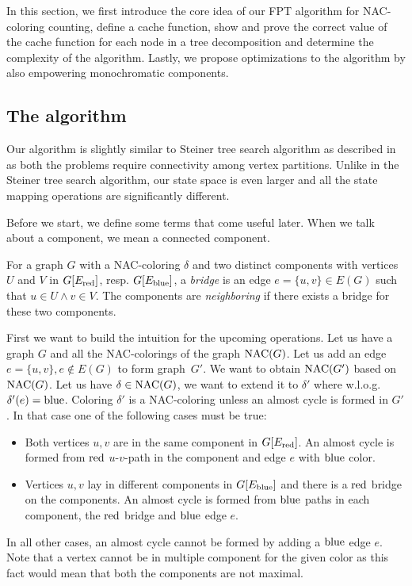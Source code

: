 In this section, we first introduce the core idea of
our FPT algorithm for NAC-coloring counting,
define a cache function,
show and prove the correct value of the cache function for each node in a tree decomposition
and determine the complexity of the algorithm.
Lastly, we propose optimizations to the algorithm by also empowering monochromatic components.

\subsection{The algorithm}

Our algorithm is slightly similar to Steiner tree search algorithm
as described in~\cite{book_parametrized_algorithms} as both the problems require connectivity
among vertex partitions. Unlike in the Steiner tree search algorithm,
our state space is even larger and all the state mapping operations are significantly different.

Before we start, we define some terms that come useful later.
When we talk about a component, we mean a connected component.
%
\begin{definition}
	For a graph \( G \) with a NAC-coloring \( \delta \)
	and two distinct components
	with vertices \( U \) and \( V \)
	in \( G[E_\text{red}] \), resp. \( G[E_\text{blue}] \),
	a \emph{bridge} is an edge \( e = \{u, v\} \in E(G) \)
	such that \( u \in U \land v \in V \).
	The components are \emph{neighboring} if there exists
	a bridge for these two components.
\end{definition}
%

First we want to build the intuition for the upcoming operations.
Let us have a graph \( G \) and all the NAC-colorings of the graph \( \operatorname{NAC}(G) \).
Let us add an edge \( e = \{u, v\}, e \not\in E(G) \) to form graph~\( G' \).
We want to obtain \( \operatorname{NAC}(G') \) based on \( \operatorname{NAC} (G) \).
%
Let us have \( \delta \in \operatorname{NAC}(G) \),
we want to extend it to \( \delta' \) where w.l.o.g.\ \( \delta'(e) = \text{blue} \).
Coloring \( \delta' \) is a NAC-coloring unless an almost cycle is formed in \( G' \).
In that case one of the following cases must be true:
%
\begin{itemize}
	\item Both vertices \( u, v \) are in the same component in \( G[E_\text{red}] \).
	      An almost cycle is formed
	      from \( \text{red} \) \( u \)-\( v \)-path in the component
	      and edge \( e \) with \( \text{blue} \) color.
	\item Vertices \( u, v \) lay in different components in \( G[E_\text{blue}] \)
	      and there is a \( \text{red} \) bridge on the components.
	      An almost cycle is formed from \( \text{blue} \) paths in each component,
	      the \( \text{red} \) bridge and \( \text{blue} \) edge \( e \).
\end{itemize}
%
In all other cases, an almost cycle cannot be formed by adding a \( \text{blue} \) edge \( e \).
Note that a vertex cannot be in multiple component for the given color
as this fact would mean that both the components are not maximal.

